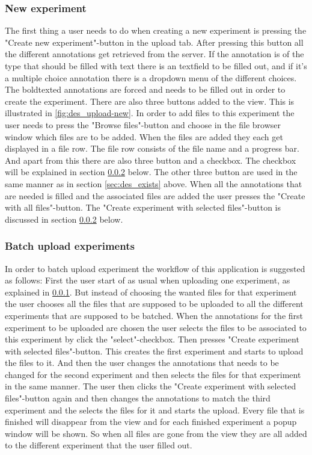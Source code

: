 \subsubsection{New experiment}
\label{sec:des_create}
The first thing a user needs to do when creating a new experiment is pressing the "Create new experiment"-button in the upload tab. After pressing this button all the different annotations get retrieved from the server. If the annotation is of the type that should be filled with text there is an textfield to be filled out, and if it's a multiple choice annotation there is a dropdown menu of the different choices. The boldtexted annotations are forced and needs to be filled out in order to create the experiment. There are also three buttons added to the view. This is illustrated in \ref{fig:des_upload-new}. In order to add files to this experiment the user needs to press the "Browse files"-button and choose in the file browser window which files are to be added. When the files are added they each get displayed in a file row. The file row consists of the file name and a progress bar. And apart from this there are also three button and a checkbox. The checkbox will be explained in section \ref{sec:des_batch} below. The other three button are used in the same manner as in section \ref{sec:des_exists} above. When all the annotations that are needed is filled and the associated files are added the user presses the "Create with all files"-button. The "Create experiment with selected files"-button is discussed in section \ref{sec:des_batch} below.
\subsubsection{Batch upload experiments}
\label{sec:des_batch}
In order to batch upload experiment the workflow of this application is suggested as follows:
First the user start of as usual when uploading one experiment, as explained in \ref{sec:des_create}. But instead of choosing the wanted files for that experiment the user chooses all the files that are supposed to be uploaded to all the different experiments that are supposed to be batched. When the annotations for the first experiment to be uploaded are chosen the user selects the files to be associated to this experiment by click the "select"-checkbox. Then presses "Create experiment with selected files"-button. This creates the first experiment and starts to upload the files to it. And then the user changes the annotations that needs to be changed for the second experiment and then selects the files for that experiment in the same manner. The user then clicks the "Create experiment with selected files"-button again and then changes the annotations to match the third experiment and the selects the files for it and starts the upload. Every file that is finished will disappear from the view and for each finished experiment a popup window will be shown. So when all files are gone from the view they are all added to the different experiment that the user filled out.


